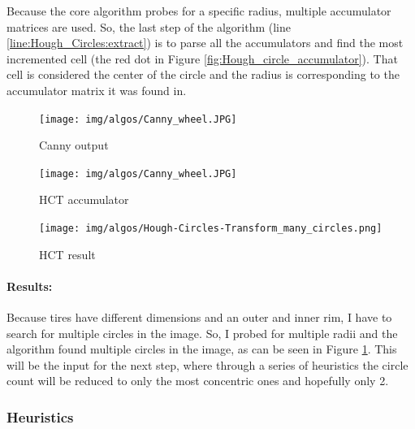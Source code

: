 Because the core algorithm probes for a specific radius, multiple accumulator matrices are used. So, the last step of the algorithm (line \ref{line:Hough_Circles:extract}) is to parse all the accumulators and find the most incremented cell (the red dot in Figure \ref{fig:Hough_circle_accumulator}). That cell is considered the center of the circle and the radius is corresponding to the accumulator matrix it was found in.

\begin{figure}
    \centering
    \begin{minipage}[c]{0.33\linewidth}
        \centering
        \texttt{[image: img/algos/Canny\_wheel.JPG]}
            \caption{Canny output}
            \label{fig:canny_output_tire}
    \end{minipage}\hfill
    \begin{minipage}[c]{0.33\linewidth}
        \centering
        \texttt{[image: img/algos/Canny\_wheel.JPG]}
            \caption{HCT accumulator}
            \label{fig:Hough_circle_accumulator}
    \end{minipage}
    \begin{minipage}[c]{0.33\linewidth}
        \centering
        \texttt{[image: img/algos/Hough-Circles-Transform\_many\_circles.png]}
        \caption{HCT result}
        \label{fig:Hough-Circles-Transform_result}
    \end{minipage}
\end{figure}

\paragraph*{Results:}\mbox{}\par
Because tires have different dimensions and an outer and inner rim, I have to search for multiple circles in the image. So, I probed for multiple radii and the algorithm found multiple circles in the image, as can be seen in Figure \ref{fig:Hough-Circles-Transform_result}. This will be the input for the next step, where through a series of heuristics the circle count will be reduced to only the most concentric ones and hopefully only 2.


\subsubsection{Heuristics}
\label{subsubsec:circ_det_heuristics}

